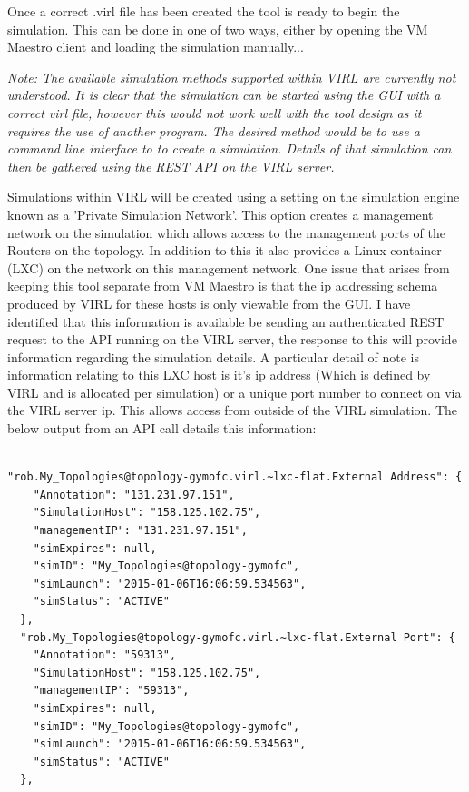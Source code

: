 \documentclass[11pt]{report}
\begin{document}
Once a correct .virl file has been created the tool is ready to begin the simulation. This can be done in one of two ways, either by opening the VM Maestro client and loading the simulation manually...

\textit{Note: The available simulation methods supported within VIRL are currently not understood. It is clear that the simulation can be started using the GUI with a correct virl file, however this would not work well with the tool design as it requires the use of another program. The desired method would be to use a command line interface to to create a simulation. Details of that simulation can then be gathered using the REST API on the VIRL server.}

Simulations within VIRL will be created using a setting on the simulation engine known as a 'Private Simulation Network'. This option creates a management network on the simulation which allows access to the management ports of the Routers on the topology. In addition to this it also provides a Linux container (LXC) on the network on this management network. One issue that arises from keeping this tool separate from VM Maestro is that the ip addressing schema produced by VIRL for these hosts is only viewable from the GUI. I have identified that this information is available be sending an authenticated REST request to the API running on the VIRL server, the response to this will provide information regarding the simulation details. A particular detail of note is information relating to this LXC host is it's ip address (Which is defined by VIRL and is allocated per simulation) or a unique port number to connect on via the VIRL server ip. This allows access from outside of the VIRL simulation. The below output from an API call details this information:

\begin{lstlisting}

"rob.My_Topologies@topology-gymofc.virl.~lxc-flat.External Address": {
    "Annotation": "131.231.97.151",
    "SimulationHost": "158.125.102.75",
    "managementIP": "131.231.97.151",
    "simExpires": null,
    "simID": "My_Topologies@topology-gymofc",
    "simLaunch": "2015-01-06T16:06:59.534563",
    "simStatus": "ACTIVE"
  },
  "rob.My_Topologies@topology-gymofc.virl.~lxc-flat.External Port": {
    "Annotation": "59313",
    "SimulationHost": "158.125.102.75",
    "managementIP": "59313",
    "simExpires": null,
    "simID": "My_Topologies@topology-gymofc",
    "simLaunch": "2015-01-06T16:06:59.534563",
    "simStatus": "ACTIVE"
  },

\end{lstlisting}
\end{document}
